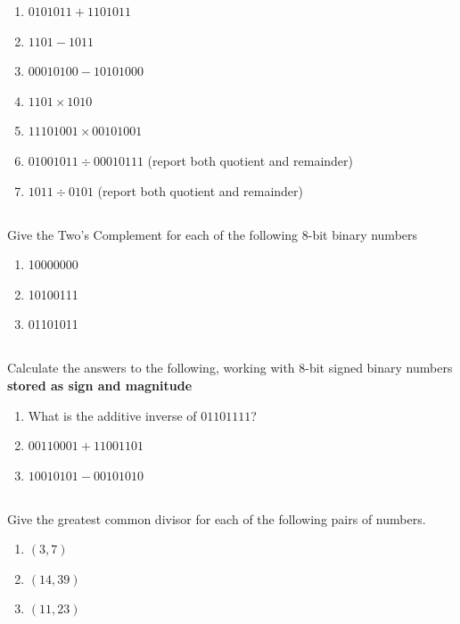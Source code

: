 \documentclass[twocolumn]{article}
\begin{document}
    \begin{enumerate}
        \item $0101011 + 1101011$
        \item $1101 - 1011$
        \item $00010100 - 10101000$
        \item $1101 \times 1010$
        \item $11101001 \times 00101001$
        \item $01001011 \div 00010111$ (report both quotient and remainder)
        \item $1011\div 0101$ (report both quotient and remainder)
    \end{enumerate}

\subsection{}

    Give the Two’s Complement for each of the following 8-bit binary numbers
        
    \begin{enumerate}
        \item 10000000
        \item 10100111
        \item 01101011
    \end{enumerate}

\subsection{}

    Calculate the answers to the following, working with 8-bit signed binary numbers \textbf{stored as sign and magnitude}

    \begin{enumerate}
        \item What is the additive inverse of $01101111$?
        \item $00110001 + 11001101$
        \item $10010101 - 00101010$
    \end{enumerate}

\subsection{}

   Give the greatest common divisor for each of the following pairs of numbers.

  \begin{enumerate}
       \item $(3, 7)$
       \item $(14, 39)$
       \item $(11, 23)$
   \end{enumerate}
\end{document}

